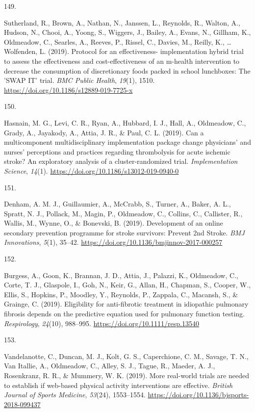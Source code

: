 \documentclass[11pt, a4paper]{awesome-cv}
\newlength{\csllabelwidth}
\newcommand{\CSLLeftMargin}[1]{\parbox[t]{\csllabelwidth}{#1}}
\newcommand{\CSLRightInline}[1]{\parbox[t]{\linewidth - \csllabelwidth}{#1}}
\begin{document}
\leavevmode\hypertarget{ref-sutherland_protocol_2019}{}%
\CSLLeftMargin{149. }
\CSLRightInline{Sutherland, R., Brown, A., Nathan, N., Janssen, L.,
Reynolds, R., Walton, A., Hudson, N., Chooi, A., Yoong, S., Wiggers, J.,
Bailey, A., Evans, N., Gillham, K., Oldmeadow, C., Searles, A., Reeves,
P., Rissel, C., Davies, M., Reilly, K., \ldots{} Wolfenden, L. (2019).
Protocol for an effectiveness- implementation hybrid trial to assess the
effectiveness and cost-effectiveness of an m-health intervention to
decrease the consumption of discretionary foods packed in school
lunchboxes: The 'SWAP IT' trial. \emph{BMC Public Health}, \emph{19}(1),
1510. \url{https://doi.org/10.1186/s12889-019-7725-x}}

\leavevmode\hypertarget{ref-hasnain_can_2019}{}%
\CSLLeftMargin{150. }
\CSLRightInline{Hasnain, M. G., Levi, C. R., Ryan, A., Hubbard, I. J.,
Hall, A., Oldmeadow, C., Grady, A., Jayakody, A., Attia, J. R., \& Paul,
C. L. (2019). Can a multicomponent multidisciplinary implementation
package change physicians' and nurses' perceptions and practices
regarding thrombolysis for acute ischemic stroke? An exploratory
analysis of a cluster-randomized trial. \emph{Implementation Science},
\emph{14}(1). \url{https://doi.org/10.1186/s13012-019-0940-0}}

\leavevmode\hypertarget{ref-denham_development_2019}{}%
\CSLLeftMargin{151. }
\CSLRightInline{Denham, A. M. J., Guillaumier, A., McCrabb, S., Turner,
A., Baker, A. L., Spratt, N. J., Pollack, M., Magin, P., Oldmeadow, C.,
Collins, C., Callister, R., Wallis, M., Wynne, O., \& Bonevski, B.
(2019). Development of an online secondary prevention programme for
stroke survivors: Prevent 2nd Stroke. \emph{BMJ Innovations},
\emph{5}(1), 35--42. \url{https://doi.org/10.1136/bmjinnov-2017-000257}}

\leavevmode\hypertarget{ref-burgess_eligibility_2019}{}%
\CSLLeftMargin{152. }
\CSLRightInline{Burgess, A., Goon, K., Brannan, J. D., Attia, J.,
Palazzi, K., Oldmeadow, C., Corte, T. J., Glaspole, I., Goh, N., Keir,
G., Allan, H., Chapman, S., Cooper, W., Ellis, S., Hopkins, P., Moodley,
Y., Reynolds, P., Zappala, C., Macansh, S., \& Grainge, C. (2019).
Eligibility for anti-fibrotic treatment in idiopathic pulmonary fibrosis
depends on the predictive equation used for pulmonary function testing.
\emph{Respirology}, \emph{24}(10), 988--995.
\url{https://doi.org/10.1111/resp.13540}}

\leavevmode\hypertarget{ref-vandelanotte_more_2019}{}%
\CSLLeftMargin{153. }
\CSLRightInline{Vandelanotte, C., Duncan, M. J., Kolt, G. S.,
Caperchione, C. M., Savage, T. N., Van Itallie, A., Oldmeadow, C.,
Alley, S. J., Tague, R., Maeder, A. J., Rosenkranz, R. R., \& Mummery,
W. K. (2019). More real-world trials are needed to establish if
web-based physical activity interventions are effective. \emph{British
Journal of Sports Medicine}, \emph{53}(24), 1553--1554.
\url{https://doi.org/10.1136/bjsports-2018-099437}}
\end{document}
